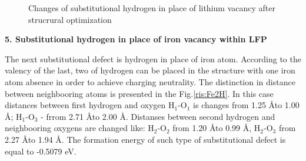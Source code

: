 \begin{figure}[h]
\begin{minipage}[h]{0.49\linewidth}
\end{minipage}
\hfill
\begin{minipage}[h]{0.49\linewidth}
\end{minipage}
\caption{Changes of substitutional hydrogen in place of lithium vacancy after strucrural optimization}
\label{ris:Li1H}
\end{figure}

\textbf{5. Substitutional hydrogen in place of iron vacancy within LFP}

The next substitutional defect is hydrogen in place of iron atom. According to the valency of the last, two of hydrogen can be placed in the structure with one iron atom absence in order to achieve charging neutrality. The distinction in distance between neighbooring atoms is presented in the Fig.\ref{ris:Fe2H}. In this case distances between first hydrogen and oxygen H$_1$-O$_1$ is changes from 1.25 \AA to 1.00 \AA; H$_1$-O$_3$ - frrom 2.71 \AA to 2.00 \AA. Distanses between second hydrogen and neighbooring oxygens are changed like: H$_2$-O$_2$ from 1.20 \AA to 0.99 \AA, H$_2$-O$_3$ from 2.27 \AA to 1.94 \AA. The formation energy of such type of substitutional defect is equal to -0.5079 eV.


